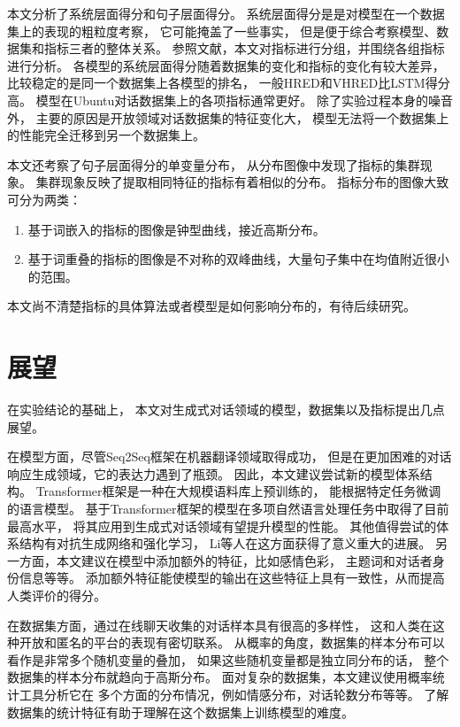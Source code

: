 本文分析了系统层面得分和句子层面得分。
系统层面得分是是对模型在一个数据集上的表现的粗粒度考察，
它可能掩盖了一些事实，
但是便于综合考察模型、数据集和指标三者的整体关系。
参照文献\cite{HowNot}，本文对指标进行分组，并围绕各组指标进行分析。
各模型的系统层面得分随着数据集的变化和指标的变化有较大差异，
比较稳定的是同一个数据集上各模型的排名，
一般HRED和VHRED比LSTM得分高。
模型在Ubuntu对话数据集上的各项指标通常更好。
除了实验过程本身的噪音外，
主要的原因是开放领域对话数据集的特征变化大，
模型无法将一个数据集上的性能完全迁移到另一个数据集上。

本文还考察了句子层面得分的单变量分布，
从分布图像中发现了指标的集群现象。
集群现象反映了提取相同特征的指标有着相似的分布。
指标分布的图像大致可分为两类：
\begin{enumerate}
    \item 基于词嵌入的指标的图像是钟型曲线，接近高斯分布。
    \item 基于词重叠的指标的图像是不对称的双峰曲线，大量句子集中在均值附近很小的范围。
\end{enumerate}
本文尚不清楚指标的具体算法或者模型是如何影响分布的，有待后续研究。

\section*{展望}\label{sec:future_work}
在实验结论的基础上，
本文对生成式对话领域的模型，数据集以及指标提出几点展望。

在模型方面，尽管Seq2Seq框架在机器翻译领域取得成功，
但是在更加困难的对话响应生成领域，它的表达力遇到了瓶颈。
因此，本文建议尝试新的模型体系结构。
Transformer框架是一种在大规模语料库上预训练的，
能根据特定任务微调的语言模型。
基于Transformer框架的模型在多项自然语言处理任务中取得了目前最高水平，
将其应用到生成式对话领域有望提升模型的性能。
其他值得尝试的体系结构有对抗生成网络和强化学习，
Li等人在这方面获得了意义重大的进展。
另一方面，本文建议在模型中添加额外的特征，比如感情色彩，
主题词和对话者身份信息等等。
添加额外特征能使模型的输出在这些特征上具有一致性，从而提高人类评价的得分。

在数据集方面，通过在线聊天收集的对话样本具有很高的多样性，
这和人类在这种开放和匿名的平台的表现有密切联系。
从概率的角度，数据集的样本分布可以看作是非常多个随机变量的叠加，
如果这些随机变量都是独立同分布的话，
整个数据集的样本分布就趋向于高斯分布。
面对复杂的数据集，本文建议使用概率统计工具分析它在
多个方面的分布情况，例如情感分布，对话轮数分布等等。
了解数据集的统计特征有助于理解在这个数据集上训练模型的难度。

